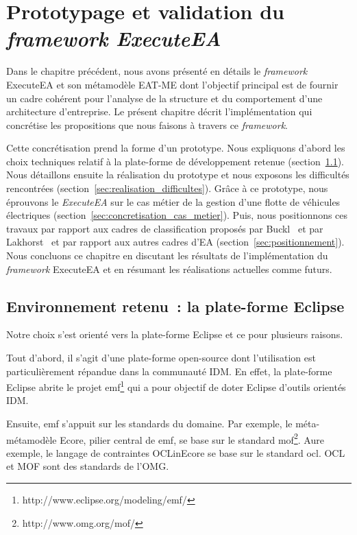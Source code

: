 \chapter{Prototypage et validation du \emph{framework ExecuteEA}}
\label{ch:implem}

\PartialToc

Dans le chapitre précédent, nous avons présenté en détails le \emph{framework}
ExecuteEA et son métamodèle EAT-ME dont l'objectif principal est de fournir
un cadre cohérent pour l'analyse de la structure et du comportement d'une
architecture d'entreprise. Le présent chapitre décrit l'implémentation qui concrétise
les propositions que nous faisons à travers ce \emph{framework}. 

Cette concrétisation prend la forme d'un prototype. Nous expliquons d'abord les
choix techniques relatif à la plate-forme de développement retenue (section~\ref{sec:Eclipse}).
Nous détaillons ensuite la réalisation du prototype et nous exposons les difficultés
rencontrées (section~\ref{sec:realisation_difficultes}). Grâce à ce prototype, nous éprouvons le \emph{ExecuteEA} sur le cas métier de la gestion
d'une flotte de véhicules électriques (section~\ref{sec:concretisation_cas_metier}). 
Puis, nous positionnons ces travaux par rapport aux cadres de classification
proposés par Buckl~\cite{buckl2009classifying} et par Lakhorst~\cite{lankhorst2013enterprise}
et par rapport aux autres cadres d'EA (section~\ref{sec:positionnement}).
Nous concluons ce chapitre en discutant les résultats de l'implémentation du \emph{framework} 
ExecuteEA et en résumant les réalisations actuelles comme futurs.



\section{Environnement retenu~: la plate-forme Eclipse}
\label{sec:Eclipse}

Notre choix s'est orienté vers la plate-forme Eclipse et ce pour plusieurs
raisons.

Tout d'abord, il s'agit d'une plate-forme open-source dont l'utilisation est
particulièrement répandue dans la communauté IDM. En effet, la plate-forme
Eclipse abrite le projet
\gls{emf}\footnote{http://www.eclipse.org/modeling/emf/} qui a pour objectif de
doter Eclipse d'outils orientés IDM.

Ensuite, \gls{emf} s'appuit sur les standards du domaine. Par exemple, le méta-métamodèle Ecore, pilier central de \gls{emf}, se base sur le standard
\gls{mof}\footnote{http://www.omg.org/mof/}. Aure exemple, le langage de
contraintes OCLinEcore se base sur le standard \gls{ocl}. OCL et MOF sont des
standards de l'OMG.

